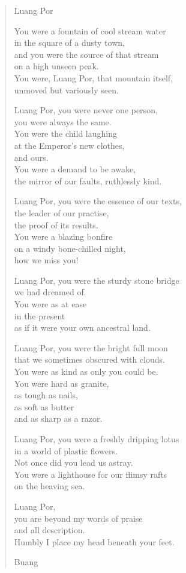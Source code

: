 
\begin{verse}
Luang Por

You were a fountain of cool stream water\\
in the square of a dusty town,\\
and you were the source of that stream\\
on a high unseen peak.\\
You were, Luang Por, that mountain itself,\\
unmoved but variously seen.

Luang Por, you were never one person,\\
you were always the same.\\
You were the child laughing\\
at the Emperor's new clothes,\\
and ours.\\
You were a demand to be awake,\\
the mirror of our faults, ruthlessly kind.

Luang Por, you were the essence of our texts,\\
the leader of our practise,\\
the proof of its results.\\
You were a blazing bonfire\\
on a windy bone-chilled night,\\
how we miss you!

Luang Por, you were the sturdy stone bridge\\
we had dreamed of.\\
You were as at ease\\
in the present\\
as if it were your own ancestral land.

Luang Por, you were the bright full moon\\
that we sometimes obscured with clouds.\\
You were as kind as only you could be.\\
You were hard as granite,\\
as tough as nails,\\
as soft as butter\\
and as sharp as a razor.

Luang Por, you were a freshly dripping lotus\\
in a world of plastic flowers.\\
Not once did you lead us astray.\\
You were a lighthouse for our flimsy rafts\\
on the heaving sea.

Luang Por,\\
you are beyond my words of praise\\
and all description.\\
Humbly I place my head beneath your feet.

Buang
\end{verse}

